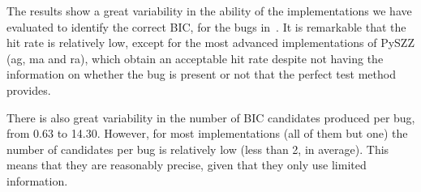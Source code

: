 The results show a great variability in the ability of the implementations we have evaluated to identify the correct BIC, for the bugs in~\datasetName. It is remarkable that the hit rate is relatively low, except for the most advanced implementations of PySZZ (ag, ma and ra), which obtain an acceptable hit rate despite not having the information on whether the bug is present or not that the perfect test method provides.

There is also great variability in the number of BIC candidates produced per bug, from 0.63 to 14.30. 
However, for most implementations (all of them but one) the number of candidates per bug is relatively low (less than 2, in average). 
This means that they are reasonably precise, given that they only use limited information.


